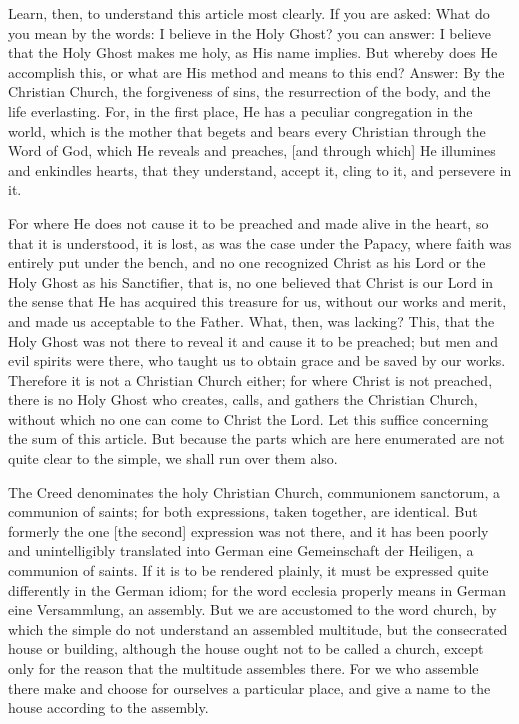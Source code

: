 Learn, then, to understand this article most clearly. If you are
asked: What do you mean by the words: I believe in the Holy Ghost? you
can answer: I believe that the Holy Ghost makes me holy, as His name
implies. But whereby does He accomplish this, or what are His method
and means to this end? Answer: By the Christian Church, the forgiveness
of sins, the resurrection of the body, and the life everlasting. For,
in the first place, He has a peculiar congregation in the world, which
is the mother that begets and bears every Christian through the Word of
God, which He reveals and preaches, [and through which] He illumines
and enkindles hearts, that they understand, accept it, cling to it, and
persevere in it.

For where He does not cause it to be preached and made alive in the
heart, so that it is understood, it is lost, as was the case under the
Papacy, where faith was entirely put under the bench, and no one
recognized Christ as his Lord or the Holy Ghost as his Sanctifier, that
is, no one believed that Christ is our Lord in the sense that He has
acquired this treasure for us, without our works and merit, and made us
acceptable to the Father. What, then, was lacking? This, that the Holy
Ghost was not there to reveal it and cause it to be preached; but men
and evil spirits were there, who taught us to obtain grace and be saved
by our works. Therefore it is not a Christian Church either; for where
Christ is not preached, there is no Holy Ghost who creates, calls, and
gathers the Christian Church, without which no one can come to Christ
the Lord. Let this suffice concerning the sum of this article. But
because the parts which are here enumerated are not quite clear to the
simple, we shall run over them also.

The Creed denominates the holy Christian Church, communionem
sanctorum, a communion of saints; for both expressions, taken
together, are identical. But formerly the one [the second] expression
was not there, and it has been poorly and unintelligibly translated
into German eine Gemeinschaft der Heiligen, a communion of saints. If
it is to be rendered plainly, it must be expressed quite differently in
the German idiom; for the word ecclesia properly means in German eine
Versammlung, an assembly. But we are accustomed to the word church, by
which the simple do not understand an assembled multitude, but the
consecrated house or building, although the house ought not to be
called a church, except only for the reason that the multitude
assembles there. For we who assemble there make and choose for
ourselves a particular place, and give a name to the house according to
the assembly.

